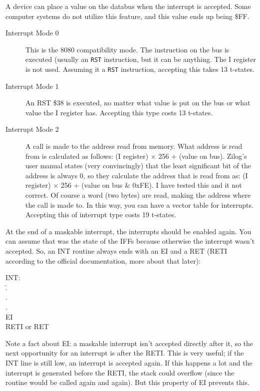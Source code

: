 \documentclass[oneside,a4paper]{book}
\begin{document}
A device can place a value on the databus when the interrupt is accepted. Some computer systems do not utilize this feature, and this value ends up being \$FF.

\begin{description}

	\item[Interrupt Mode 0]
	This is the 8080 compatibility mode. The instruction on the bus is executed (usually an {\tt RST} instruction, but it can be anything.  The I register is not used. Assuming it a {\tt RST} instruction, accepting this takes 13 t-states.

	\item[Interrupt Mode 1]
	An RST \$38 is executed, no matter what value is put on the bus or what value the I register has. Accepting this type costs 13 t-states.

	\item[Interrupt Mode 2]
	A call is made to the address read from memory. What address is read from is calculated as follows: (I register) $\times$ 256 + (value on bus). Zilog's user manual states (very convincingly) that the least significant bit of the address is always 0, so they calculate the address that is read from as: (I register) $\times$ 256 + (value on bus \& 0xFE). I have tested this and it not correct. Of course a word (two bytes) are read, making the address where the call is made to. In this way, you can have a vector table for interrupts. Accepting this of interrupt type costs 19 t-states.

\end{description}

At the end of a maskable interrupt, the interrupts should be enabled again. You can assume that was the state of the IFFs because otherwise the interrupt wasn't accepted. So, an INT routine always ends with an {\ttfamily EI} and a {\ttfamily RET} ({\ttfamily RETI} according to the official documentation, more about that later):

{\ttfamily
	\begin{tabbing}
		INT:\\
		{\qquad}\=.\\
		\>.\\
		\>.\\
		\>EI\\
		\>RETI {\rmfamily or} RET
	\end{tabbing}
}

Note a fact about {\ttfamily EI}: a maskable interrupt isn't accepted directly after it, so the next opportunity for an interrupt is after the {\ttfamily RETI}. This is very useful; if the INT line is still low, an interrupt is accepted again.  If this happens a lot and the interrupt is generated before the {\ttfamily RETI}, the stack could overflow (since the routine would be called again and again). But this property of {\ttfamily EI} prevents this.
\end{document}
